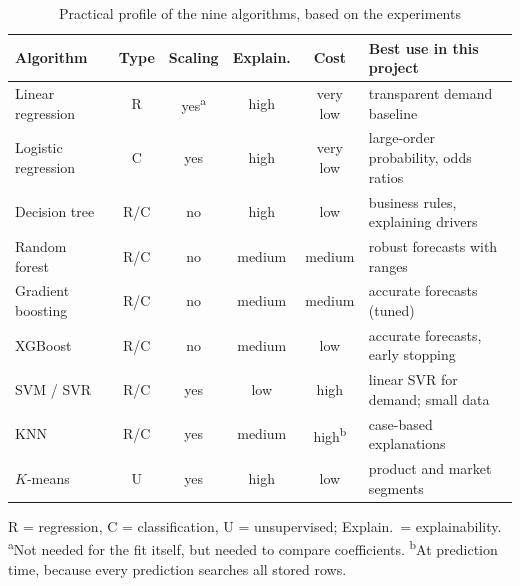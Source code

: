 \begin{table}[htbp]\centering\small
\caption{Practical profile of the nine algorithms, based on the experiments}\label{tab:algoprofile}
\begin{tabularx}{\linewidth}{@{}lcccc>{\raggedright\arraybackslash}X@{}}
\toprule
\textbf{Algorithm} & \textbf{Type} & \textbf{Scaling} & \textbf{Explain.} & \textbf{Cost} & \textbf{Best use in this project} \\ \midrule
Linear regression & R & yes\textsuperscript{a} & high & very low & transparent demand baseline \\
Logistic regression & C & yes & high & very low & large-order probability, odds ratios \\
Decision tree & R/C & no & high & low & business rules, explaining drivers \\
Random forest & R/C & no & medium & medium & robust forecasts with ranges \\
Gradient boosting & R/C & no & medium & medium & accurate forecasts (tuned) \\
XGBoost & R/C & no & medium & low & accurate forecasts, early stopping \\
SVM / SVR & R/C & yes & low & high & linear SVR for demand; small data \\
KNN & R/C & yes & medium & high\textsuperscript{b} & case-based explanations \\
$K$-means & U & yes & high & low & product and market segments \\ \bottomrule
\end{tabularx}
\par\smallskip\footnotesize R = regression, C = classification, U = unsupervised; Explain.\ = explainability.
\textsuperscript{a}Not needed for the fit itself, but needed to compare coefficients.
\textsuperscript{b}At prediction time, because every prediction searches all stored rows.
\end{table}


